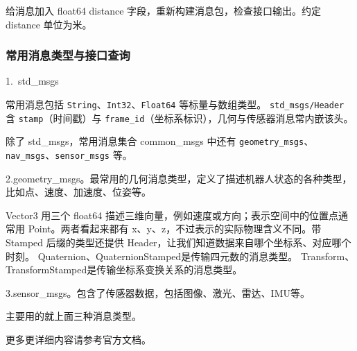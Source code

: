 \begin{exercise}
\label{ex:v2-ros-message}
给消息加入 float64 distance 字段，重新构建消息包，检查接口输出。约定 distance 单位为米。
\end{exercise}
\subsubsection{常用消息类型与接口查询}

1.\ std\_msgs

常用消息包括 \texttt{String}、\texttt{Int32}、\texttt{Float64} 等标量与数组类型。
\texttt{std\_msgs/Header} 含 \texttt{stamp}（时间戳）与 \texttt{frame\_id}（坐标系标识），几何与传感器消息常内嵌该头。

除了 std\_msgs，常用消息集合 common\_msgs 中还有 \texttt{geometry\_msgs}、\texttt{nav\_msgs}、\texttt{sensor\_msgs} 等。

2.geometry\_msgs。最常用的几何消息类型，定义了描述机器人状态的各种类型，比如点、速度、加速度、位姿等。

Vector3 用三个 float64 描述三维向量，例如速度或方向；表示空间中的位置点通常用 Point。两者看起来都有 x、y、z，不过表示的实际物理含义不同。带 Stamped 后缀的类型还提供 Header，让我们知道数据来自哪个坐标系、对应哪个时刻。
Quaternion、QuaternionStamped是传输四元数的消息类型。
Transform、TransformStamped是传输坐标系变换关系的消息类型。

3.sensor\_msgs。包含了传感器数据，包括图像、激光、雷达、IMU等。

主要用的就上面三种消息类型。



更多更详细内容请参考官方文档。

